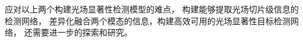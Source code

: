 


应对以上两个构建光场显著性检测模型的难点，
构建能够提取光场切片级信息的检测网络，
差异化融合两个模态的信息，构建高效可用的光场显著性目标检测网络，
还需要进一步的探索和研究。


%




%
%



